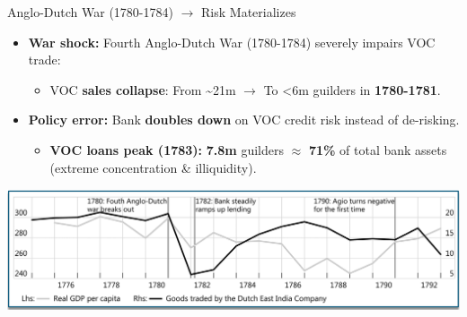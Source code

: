 \documentclass[aspectratio=169, xcolor=table]{beamer}
\begin{document}
\begin{frame}{Anglo-Dutch War (1780-1784) \texorpdfstring{$\rightarrow$}{->} Risk Materializes}
  \begin{itemize}
    \item \textbf{War shock:} Fourth Anglo-Dutch War (1780-1784) severely impairs VOC trade:
          \begin{itemize}
            \item VOC \textbf{sales collapse}: From \textasciitilde{}21m $\rightarrow$ To <6m guilders in \textbf{1780-1781}.
          \end{itemize}
    \item \textbf{Policy error:} Bank \textbf{doubles down} on VOC credit risk instead of de-risking.
          \begin{itemize}
            \item \textbf{VOC loans peak (1783):} \textbf{7.8m} guilders $\approx$ \textbf{71\%} of total bank assets (extreme concentration \& illiquidity).
          \end{itemize}
  \end{itemize}
  \begin{center}
    \includegraphics[width=0.8\linewidth]{pasted-images/voc_sales.png}
  \end{center}
\end{frame}
\end{document}

